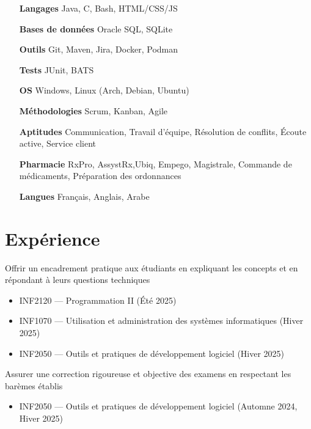 \documentclass[letterpaper,10pt]{article}
\begin{document}
  \begin{multicols}{2}
    \begin{itemize}[itemsep=-2px, parsep=5pt, leftmargin=75pt]
      \item[\textbf{Langages}] Java, C, Bash, HTML/CSS/JS
      \item[\textbf{Bases de données}] Oracle SQL, SQLite
      \item[\textbf{Outils}] Git, Maven, Jira, Docker, Podman
      \item[\textbf{Tests}] JUnit, BATS
      \item[\textbf{OS}]  Windows, Linux (Arch, Debian, Ubuntu)
      \item[\textbf{Méthodologies}]  Scrum, Kanban, Agile
      \item[\textbf{Aptitudes}]  Communication, Travail d'équipe, Résolution de conflits, Écoute active, Service client
      \item[\textbf{Pharmacie}]  RxPro, AssystRx,Ubiq, Empego, Magistrale, Commande de médicaments, Préparation des ordonnances
      \item[\textbf{Langues}]  Français, Anglais, Arabe
    \end{itemize}
  \end{multicols}


  \section{Expérience}

  \begin{resume_list}
    \item Offrir un encadrement pratique aux étudiants en expliquant les concepts et en répondant à leurs questions techniques
    \begin{itemize}
        \item INF2120 — Programmation II (Été 2025)
        \item INF1070 — Utilisation et administration des systèmes informatiques (Hiver 2025)
        \item INF2050 — Outils et pratiques de développement logiciel (Hiver 2025)
    \end{itemize}
  \vspace{3pt}
  
    \item Assurer une correction rigoureuse et objective des examens en respectant les barèmes établis
    \begin{itemize}
        \item INF2050 — Outils et pratiques de développement logiciel (Automne 2024, Hiver 2025)
    \end{itemize}
  \end{resume_list}
\end{document}

